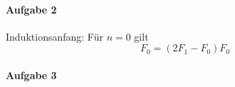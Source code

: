 \documentclass{article}
\begin{document}



\paragraph{Aufgabe 2}

Induktionsanfang: Für $n = 0$ gilt
\begin{equation*}
    F_0 = (2F_1 - F_0)F_0
\end{equation*}

\paragraph{Aufgabe 3}
\end{document}
